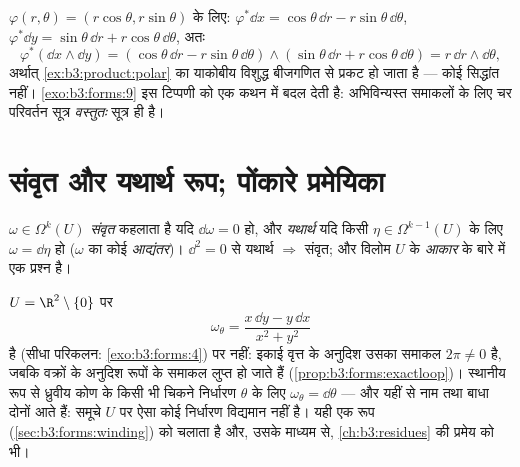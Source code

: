 \begin{example}[ध्रुवीय निर्देशांक]\label{ex:b3:forms:polar}
$\varphi(r, \theta) = (r\cos\theta, r\sin\theta)$ के लिए: $\varphi^*\dd x = \cos\theta\,\dd r -
r\sin\theta\,\dd\theta$, $\varphi^*\dd y = \sin\theta\,\dd r
+ r\cos\theta\,\dd\theta$, अतः
\[
\varphi^*(\dd x \wedge \dd y) =
(\cos\theta\,\dd r - r\sin\theta\,\dd\theta) \wedge
(\sin\theta\,\dd r + r\cos\theta\,\dd\theta)
= r\,\dd r \wedge \dd\theta,
\]
अर्थात् \cref{ex:b3:product:polar} का याकोबीय विशुद्ध बीजगणित से प्रकट हो जाता है ---
कोई  सिद्धांत नहीं। \cref{exo:b3:forms:9} इस टिप्पणी को एक कथन में बदल देती
है: अभिविन्यस्त समाकलों के लिए चर परिवर्तन सूत्र \emph{वस्तुतः}
 सूत्र ही है।
\end{example}

\section{संवृत और यथार्थ रूप; पोंकारे प्रमेयिका}

\begin{definition}\label{def:b3:forms:closedexact}
$\omega \in \Omega^k(U)$ \emph{संवृत} कहलाता है यदि $\dd\omega = 0$ हो, और
\emph{यथार्थ} यदि किसी $\eta \in \Omega^{k-1}(U)$ के लिए $\omega = \dd\eta$ हो
($\omega$ का कोई \emph{आद्यंतर})। $\dd^2 = 0$ से यथार्थ $\Rightarrow$ संवृत; और
विलोम $U$ के \emph{आकार} के बारे में एक प्रश्न है।
\end{definition}

\begin{example}[कोणीय रूप]\label{ex:b3:forms:angular}
$U = \R^2 \setminus \{0\}$ पर
\[
\omega_\theta = \frac{x\,\dd y - y\,\dd x}{x^2 + y^2}
\]
 है (सीधा परिकलन: \cref{exo:b3:forms:4}) पर  नहीं: इकाई वृत्त के
अनुदिश उसका समाकल $2\pi \neq 0$ है, जबकि  वक्रों के अनुदिश 
रूपों के समाकल लुप्त हो जाते हैं (\cref{prop:b3:forms:exactloop})। स्थानीय रूप से ध्रुवीय
कोण के किसी भी चिकने निर्धारण $\theta$ के लिए $\omega_\theta = \dd\theta$ --- और यहीं से
नाम तथा बाधा दोनों आते हैं: समूचे $U$ पर ऐसा कोई निर्धारण
विद्यमान नहीं है। यही एक रूप  (\cref{sec:b3:forms:winding}) को चलाता है और,
उसके माध्यम से, \cref{ch:b3:residues} की  प्रमेय को भी।
\end{example}

